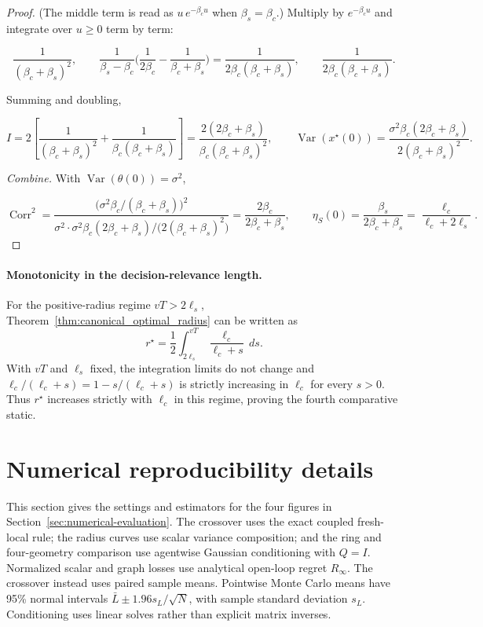 \begin{proof}
(The middle term is read as $u\,e^{-\beta_c u}$ when $\beta_s=\beta_c$.) Multiply by $e^{-\beta_c u}$ and integrate over $u\ge0$ term by term:

\[
\frac{1}{(\beta_c+\beta_s)^2},\qquad \frac{1}{\beta_s-\beta_c}\Big(\frac{1}{2\beta_c}-\frac{1}{\beta_c+\beta_s}\Big)=\frac{1}{2\beta_c(\beta_c+\beta_s)},\qquad \frac{1}{2\beta_c(\beta_c+\beta_s)} .
\]

Summing and doubling,

\begin{equation}
I=2\left[\frac{1}{(\beta_c+\beta_s)^2}+\frac{1}{\beta_c(\beta_c+\beta_s)}\right]=\frac{2(2\beta_c+\beta_s)}{\beta_c(\beta_c+\beta_s)^2},\qquad \operatorname{Var}(x^\star(0))=\frac{\sigma^2\beta_c(2\beta_c+\beta_s)}{2(\beta_c+\beta_s)^2}.
\end{equation}

\emph{Combine.} With $\operatorname{Var}(\theta(0))=\sigma^2$,

\[
\operatorname{Corr}^2=\frac{\big(\sigma^2\beta_c/(\beta_c+\beta_s)\big)^2}{\sigma^2\cdot\sigma^2\beta_c(2\beta_c+\beta_s)/\big(2(\beta_c+\beta_s)^2\big)}=\frac{2\beta_c}{2\beta_c+\beta_s},\qquad \eta_S(0)=\frac{\beta_s}{2\beta_c+\beta_s}=\frac{\ell_c}{\ell_c+2\ell_s}.
\]
\end{proof}

\paragraph{Monotonicity in the decision-relevance length.}
For the positive-radius regime $vT>2\ell_s$, Theorem~\ref{thm:canonical_optimal_radius}
can be written as
\begin{equation}
r^\star=\frac12\int_{2\ell_s}^{vT}\frac{\ell_c}{\ell_c+s}\,ds.
\label{eq:rstar_integral_representation}
\end{equation}
With $vT$ and $\ell_s$ fixed, the integration limits do not change and
$\ell_c/(\ell_c+s)=1-s/(\ell_c+s)$ is strictly increasing in $\ell_c$
for every $s>0$. Thus $r^\star$ increases strictly with $\ell_c$ in this
regime, proving the fourth comparative static.

\section{Numerical reproducibility details}
\label{app:technical-numerics}
This section gives the settings and estimators for the four figures in
Section~\ref{sec:numerical-evaluation}. The crossover uses the exact coupled
fresh-local rule; the radius curves use scalar variance composition; and
the ring and four-geometry comparison use agentwise Gaussian conditioning with $Q=I$.
Normalized scalar and graph losses use analytical open-loop regret
$R_\infty$. The crossover instead uses paired sample means.
Pointwise Monte Carlo means have 95\% normal intervals
$\bar L\pm1.96s_L/\sqrt N$, with sample standard deviation $s_L$.
Conditioning uses linear solves rather than explicit matrix inverses.

